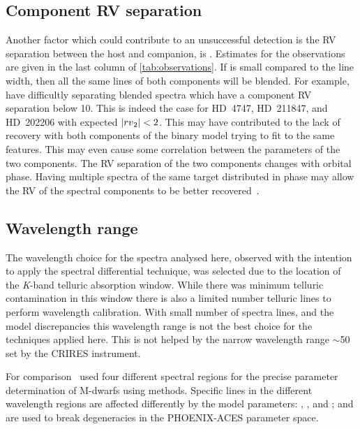 \subsection{Component {RV} separation}
\label{subsec:rv_seperation}
Another factor which could contribute to an unsuccessful detection is the {RV} separation between the host and companion, is \Rvtwo{}.
Estimates for the observations are given in the last column of \cref{tab:observations}.
If \Rvtwo{} is small compared to the line width, then all the same lines of both components will be blended.
For example,~\citet{kolbl_detection_2015} have difficultly separating blended spectra which have a component {RV} separation below 10\kmps{}.
This is indeed the case for {HD~4747}, {HD~211847}, and {HD~202206} with expected \(|{rv{}}_{2}{}| < 2\)\kmps{}.
This may have contributed to the lack of recovery with both components of the binary model trying to fit to the same features.
This may even cause some correlation between the parameters of the two components.
The {RV} separation of the two components changes with orbital phase.
Having multiple spectra of the same target distributed in phase may allow the {RV} of the spectral components to be better recovered~\citep [e.g.][]{czekala_disentangling_2017, sablowski_spectral_2016, piskorz_evidence_2016}.

\subsection {Wavelength range}
\label{subsec:wavelenght_range_limitation}
The wavelength choice for the spectra analysed here, observed with the intention to apply the spectral differential technique, was selected due to the location of the \emph{K}-band telluric absorption window.
While there was minimum telluric contamination in this window there is also a limited number telluric lines to perform wavelength calibration.
With small number of spectra lines, and the model discrepancies this wavelength range is not the best choice for the techniques applied here.
This is not helped by the narrow wavelength range \(\sim\)50\nm{} set by the CRIRES instrument.

For comparison~\citet{passegger_fundamental_2016} used four different spectral regions for the precise parameter determination of M-dwarfs using \textchisquared{} methods.
Specific lines in the different wavelength regions are affected differently by the model parameters: \Teff{}, \Logg{}, and \feh{}; and are used to break degeneracies in the {PHOENIX-ACES} parameter space.

